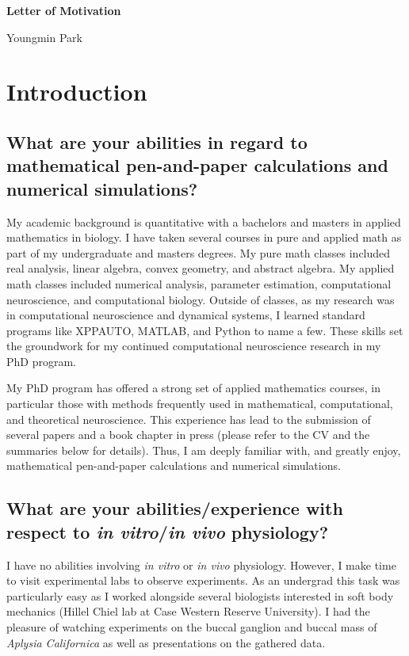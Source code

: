 \documentclass[a4paper,11pt]{article}
\begin{document}
\begin{center}
\Large \textbf{Letter of Motivation}

\Large Youngmin Park
\end{center}


\section{Introduction}
\subsection{What are your abilities in regard to mathematical pen-and-paper calculations and numerical simulations? }
My academic background is quantitative with a bachelors and masters in applied mathematics in biology. I have taken several courses in pure and applied math as part of my undergraduate and masters degrees. My pure math classes included real analysis, linear algebra, convex geometry, and abstract algebra. My applied math classes included numerical analysis, parameter estimation, computational neuroscience, and computational biology. Outside of classes, as my research was in computational neuroscience and dynamical systems, I learned standard programs like XPPAUTO, MATLAB, and Python to name a few. These skills set the groundwork for my continued computational neuroscience research in my PhD program.

My PhD program has offered a strong set of applied mathematics courses, in particular those with methods frequently used in mathematical, computational, and theoretical neuroscience. This experience has lead to the submission of several papers and a book chapter in press (please refer to the CV and the summaries below for details). Thus, I am deeply familiar with, and greatly enjoy, mathematical pen-and-paper calculations and numerical simulations.

\subsection{What are your abilities/experience with respect to \textit{in vitro}/\textit{in vivo} physiology?}
I have no abilities involving \textit{in vitro} or \textit{in vivo} physiology. However, I make time to visit experimental labs to observe experiments. As an undergrad this task was particularly easy as I worked alongside several biologists interested in soft body mechanics (Hillel Chiel lab at Case Western Reserve University). I had the pleasure of watching experiments on the buccal ganglion and buccal mass of \textit{Aplysia Californica} as well as presentations on the gathered data.
\end{document}

